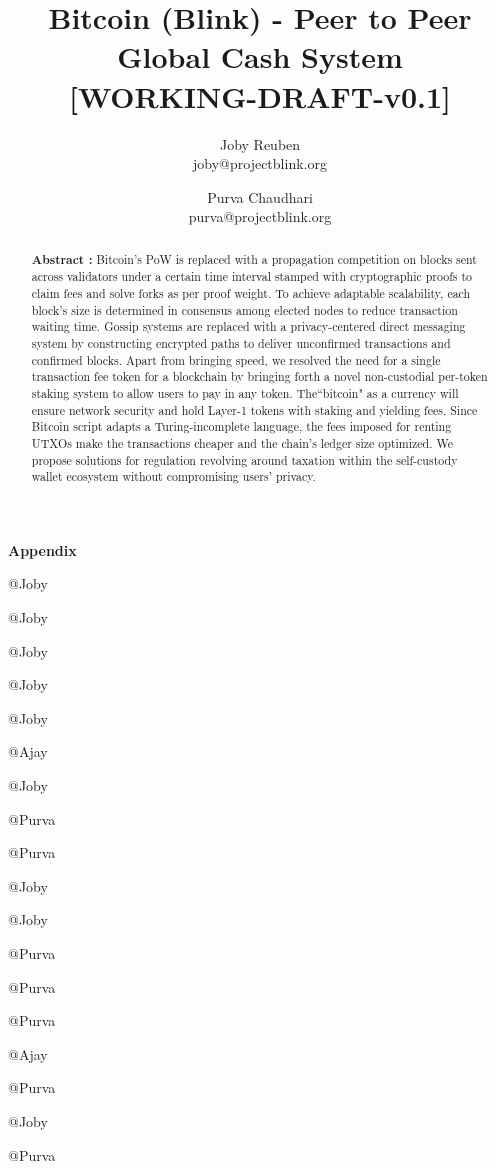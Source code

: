 \documentclass[a4paper,10pt]{article}
\title{
 \large \textbf{Bitcoin (Blink) - Peer to Peer Global Cash System}\\
\vspace{6mm}
\scriptsize[WORKING-DRAFT-v0.1]
}
\author{ \myfontt Joby Reuben \\ \myfontt joby@projectblink.org \and  \myfontt Purva Chaudhari \\ \myfontt purva@projectblink.org}
\date{}
\begin{document}
\maketitle
\begin{abstract}
\noindent \textbf{Abstract :} Bitcoin's PoW is replaced with a propagation competition on blocks sent across validators under a certain time interval stamped with cryptographic proofs to claim fees and solve forks as per proof weight. To achieve adaptable scalability, each block's size is determined in consensus among elected nodes to reduce transaction waiting time. Gossip systems are replaced with a privacy-centered direct messaging system by constructing encrypted paths to deliver unconfirmed transactions and confirmed blocks. Apart from bringing speed, we resolved the need for a single transaction fee token for a blockchain by bringing forth a novel non-custodial per-token staking system to allow users to pay in any token. The``bitcoin" as a currency will ensure network security and hold Layer-1 tokens with staking and yielding fees. Since Bitcoin script adapts a Turing-incomplete language, the fees imposed for renting UTXOs make the transactions cheaper and the chain's ledger size optimized. We propose solutions for regulation revolving around taxation within the self-custody wallet ecosystem without compromising users' privacy. 
\end{abstract}














\newpage
\normalsize
\appendix
\noindent \Large \textbf{Appendix}


@Joby

@Joby

@Joby

@Joby

@Joby

@Ajay

@Joby

@Purva

@Purva

@Joby

@Joby


@Purva

@Purva

@Purva


@Ajay

@Purva

@Joby

@Purva
\end{document}
